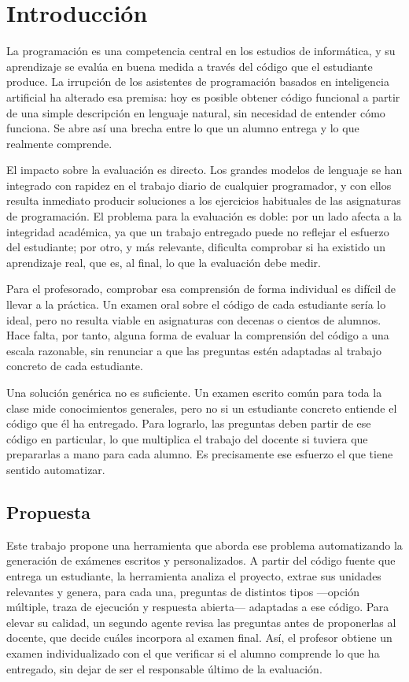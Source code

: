 \chapter{Introducción}
\label{cap:introduccion}

La programación es una competencia central en los estudios de informática, y su
aprendizaje se evalúa en buena medida a través del código que el estudiante
produce. La irrupción de los asistentes de programación basados en inteligencia
artificial ha alterado esa premisa: hoy es posible obtener código funcional a
partir de una simple descripción en lenguaje natural, sin necesidad de entender
cómo funciona. Se abre así una brecha entre lo que un alumno entrega y lo que
realmente comprende.

El impacto sobre la evaluación es directo. Los grandes modelos de lenguaje se han integrado
con rapidez en el trabajo diario de cualquier programador, y con ellos resulta
inmediato producir soluciones a los ejercicios habituales de las asignaturas de
programación. El problema para la evaluación es doble: por un lado afecta a la
integridad académica, ya que un trabajo entregado puede no reflejar el esfuerzo
del estudiante; por otro, y más relevante, dificulta comprobar si ha existido un
aprendizaje real, que es, al final, lo que la evaluación debe medir.

Para el profesorado, comprobar esa comprensión de forma individual es difícil de
llevar a la práctica. Un examen oral sobre el código de cada estudiante sería lo
ideal, pero no resulta viable en asignaturas con decenas o cientos de alumnos.
Hace falta, por tanto, alguna forma de evaluar la comprensión del código a una
escala razonable, sin renunciar a que las preguntas estén adaptadas al trabajo
concreto de cada estudiante.

Una solución genérica no es suficiente. Un examen escrito común para toda la
clase mide conocimientos generales, pero no si un estudiante concreto entiende
el código que él ha entregado. Para lograrlo, las preguntas deben partir de ese
código en particular, lo que multiplica el trabajo del docente si tuviera que
prepararlas a mano para cada alumno. Es precisamente ese esfuerzo el que tiene
sentido automatizar.


\section{Propuesta}
\label{sec:intro-propuesta}

Este trabajo propone una herramienta que aborda ese problema automatizando la
generación de exámenes escritos y personalizados. A partir del código fuente que
entrega un estudiante, la herramienta analiza el proyecto, extrae sus unidades
relevantes y genera, para cada una, preguntas de distintos tipos ---opción
múltiple, traza de ejecución y respuesta abierta--- adaptadas a ese código. Para
elevar su calidad, un segundo agente revisa las preguntas antes de proponerlas
al docente, que decide cuáles incorpora al examen final. Así, el
profesor obtiene un examen individualizado con el que verificar si el alumno
comprende lo que ha entregado, sin dejar de ser el responsable último de la
evaluación.

